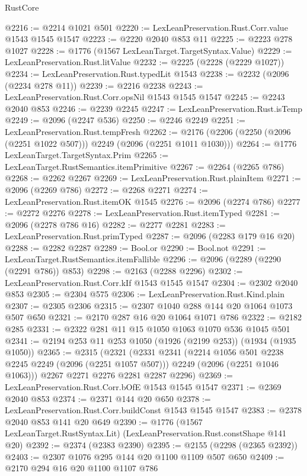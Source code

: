 \begin{lexlean}{RustCore}
\begin{coremodule}
@2216 := @2214 @1021 @501
@2220 := LexLeanPreservation.Rust.Corr.value @1543 @1545 @1547
@2223 := @2220 @2040 @853 @11
@2225 := @2223 @278 @1027
@2228 := @1776 (@1567 LexLeanTarget.TargetSyntax.Value)
@2229 := LexLeanPreservation.Rust.litValue
@2232 := @2225 (@2228 (@2229 @1027))
@2234 := LexLeanPreservation.Rust.typedLit @1543
@2238 := @2232 (@2096 (@2234 @278 @11))
@2239 := @2216 @2238
@2243 := LexLeanPreservation.Rust.Corr.opsNil @1543 @1545 @1547
@2245 := @2243 @2040 @853
@2246 := @2239 @2245
@2247 := LexLeanPreservation.Rust.isTemp
@2249 := @2096 (@2247 @536)
@2250 := @2246 @2249
@2251 := LexLeanPreservation.Rust.tempFresh
@2262 := @2176 (@2206 (@2250 (@2096 (@2251 @1022 @507))) @2249 (@2096 (@2251 @1011 @1030)))
@2264 := @1776 LexLeanTarget.TargetSyntax.Prim
@2265 := LexLeanTarget.RustSemantics.itemPrimitive
@2267 := @2264 (@2265 @786)
@2268 := @2262 @2267
@2269 := LexLeanPreservation.Rust.plainItem
@2271 := @2096 (@2269 @786)
@2272 := @2268 @2271
@2274 := LexLeanPreservation.Rust.itemOK @1545
@2276 := @2096 (@2274 @786)
@2277 := @2272 @2276
@2278 := LexLeanPreservation.Rust.itemTyped
@2281 := @2096 (@2278 @786 @16)
@2282 := @2277 @2281
@2283 := LexLeanPreservation.Rust.primTyped
@2287 := @2096 (@2283 @179 @16 @20)
@2288 := @2282 @2287
@2289 := Bool.or
@2290 := Bool.not
@2291 := LexLeanTarget.RustSemantics.itemFallible
@2296 := @2096 (@2289 (@2290 (@2291 @786)) @853)
@2298 := @2163 (@2288 @2296)
@2302 := LexLeanPreservation.Rust.Corr.kIf @1543 @1545 @1547
@2304 := @2302 @2040 @853
@2305 := @2304 @575
@2306 := LexLeanPreservation.Rust.Kind.plain
@2307 := @2305 @2306
@2315 := @2307 @1040 @288 @144 @20 @1064 @1073 @507 @650
@2321 := @2170 @287 @16 @20 @1064 @1071 @786
@2322 := @2182 @285
@2331 := @2322 @281 @11 @15 @1050 @1063 @1070 @536 @1045 @501
@2341 := @2194 @253 @11 @253 @1050 (@1926 (@2199 @253)) (@1934 (@1935 @1050))
@2365 := @2315
    (@2321
      (@2331
        @2341
        (@2214 @1056 @501 @2238 @2245 @2249 (@2096 (@2251 @1057 @507)))
        @2249
        (@2096 (@2251 @1046 @1063)))
      @2267
      @2271
      @2276
      @2281
      @2287
      @2296)
@2369 := LexLeanPreservation.Rust.Corr.bOfE @1543 @1545 @1547
@2371 := @2369 @2040 @853
@2374 := @2371 @144 @20 @650
@2378 := LexLeanPreservation.Rust.Corr.buildConst @1543 @1545 @1547
@2383 := @2378 @2040 @853 @141 @20 @649
@2390 := @1776 (@1567 LexLeanTarget.RustSyntax.Lit) (LexLeanPreservation.Rust.constShape @141 @20)
@2392 := @2374 (@2383 @2390)
@2395 := @2155 (@2298 (@2365 @2392))
@2403 := @2307 @1076 @295 @144 @20 @1100 @1109 @507 @650
@2409 := @2170 @294 @16 @20 @1100 @1107 @786

\end{coremodule}
\end{lexlean}
